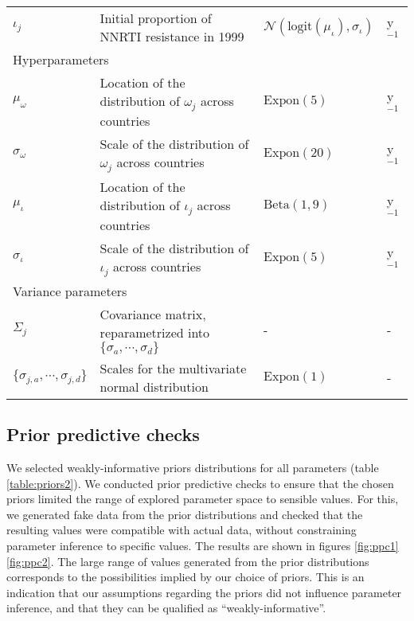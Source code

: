 \documentclass{article}
\begin{document}
\begin{table}[H]
\begin{tabular}{lp{9.5cm}p{2.9cm}l}
			\hspace{.8em}$\iota_j$ & Initial proportion of NNRTI resistance in 1999 & $\mathcal{N}(\text{logit} (\mu_{\iota}),\sigma_{\iota})$ & y$^{-1}$\\ [.2em]
			\multicolumn{4}{l}{{Hyperparameters}} \\[.2em]
			\hspace{.8em}$\mu_{\omega}$ & Location of the distribution of $\omega_j$ across countries & $\text{Expon}(5)$ & y$^{-1}$\\ 
			\hspace{.8em}$\sigma_{\omega}$ &  Scale of the distribution of  $\omega_j$ across countries & $\text{Expon}(20)$ & y$^{-1}$\\ 
			\hspace{.8em}$\mu_{\iota}$ & Location of the distribution of $\iota_j$ across countries & $\text{Beta}(1,9)$ & y$^{-1}$\\ 
			\hspace{.8em}$\sigma_{\iota}$ &  Scale of the distribution of  $\iota_j$ across countries & $\text{Expon}(5)$ & y$^{-1}$\\ [.2em]
			\multicolumn{4}{l}{{Variance parameters}} \\[.2em]
			\hspace{.8em}$\Sigma_j$ & Covariance matrix, reparametrized into $\{\sigma_a,\cdots,\sigma_d\}$ & - & -\\ 
			\hspace{.8em}$\{\sigma_{j,a},\cdots,\sigma_{j,d}\}$ & Scales for the multivariate normal distribution & $\text{Expon}(1)$& -\\
			\hline 
			
		\end{tabular} 
	\end{table}
	
	
	\subsection{Prior predictive checks}
	
	We selected weakly-informative priors distributions for all parameters (table \ref{table:priors2}).
	We conducted prior predictive checks \cite{gabry2019visualization} to ensure that the chosen priors limited the range of explored parameter space to sensible values.
	For this, we generated fake data from the prior distributions and checked that the resulting values were compatible with actual data, without constraining parameter inference to specific values.
	The results are shown in figures \ref{fig:ppc1} \ref{fig:ppc2}.
	The large range of values generated from the prior distributions corresponds to the possibilities implied by our choice of priors.
	This is an indication that our assumptions regarding the priors did not influence parameter inference, and that they can be qualified as ``weakly-informative''.
	
\end{document}
